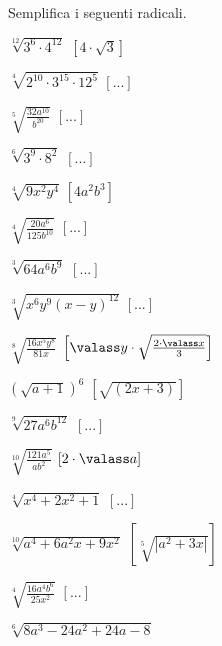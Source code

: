 \begin{esercizio}[\Ast]
 \label{ese:2.27}
Semplifica i seguenti radicali.
 \begin{multicols}{2}
 \begin{enumeratea}
 \item $\sqrt[12]{3^6\cdot 4^{12}}$
  \hfill $\left[4\cdot \sqrt 3\right]$
 \item $\sqrt[4]{2^{10}\cdot 3^{15}\cdot 12^5}$
  \hfill $\left[...\right]$
 \item $\sqrt[5]{\frac{32a^{10}}{b^{20}}}$
  \hfill $\left[...\right]$
 \item $\sqrt[6]{3^9\cdot 8^2}$
  \hfill $\left[...\right]$
 \item $\sqrt[4]{9x^2y^4}$
  \hfill $\left[4a^2b^3\right]$
 \item $\sqrt[4]{\frac{20a^6}{125b^{10}}}$
  \hfill $\left[...\right]$
 \item $\sqrt[3]{64a^6b^9}$
  \hfill $\left[...\right]$
 \item $\sqrt[3]{x^6y^9(x-y)^{12}}$
  \hfill $\left[...\right]$
 \item $\sqrt[8]{\frac{16x^5y^8}{81x}}$
  \hfill $\left[\valass y \cdot \sqrt{\frac{2\cdot \valass x} 3}\right]$
 \item $\left(\sqrt{a+1}\right)^6$
  \hfill $\left[\sqrt{(2x+3)}\right]$
 \item $\sqrt[9]{27a^6b^{12}}$
  \hfill $\left[...\right]$
 \item $\sqrt[10]{\frac{121a^5}{ab^2}}$
  \hfill $\left[2\cdot \valass a\right]$
 \item $\sqrt[4]{x^4+2x^2+1}$
  \hfill $\left[...\right]$
 \item $\sqrt[10]{a^4+6a^2x+9x^2}$
  \hfill $\left[\sqrt[5]{\left|a^2+3x\right|}\right]$
 \item $\sqrt[4]{\frac{16a^4b^6}{25x^2}}$
  \hfill $\left[...\right]$
 \item $\sqrt[6]{8a^3-24a^2+24a-8}$

\end{enumeratea}
\end{multicols}
\end{esercizio}
